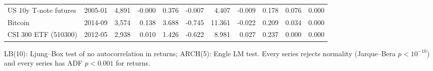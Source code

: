 \begin{table}[!htbp]
\begin{adjustbox}{max width=\textwidth}
\begin{tabular}{lrrrrrrrrrr}
US 10y T-note futures & 2005-01 & 4,891 & -0.000 & 0.376 & -0.007 & 4.407 & -0.009 & 0.178 & 0.076 & 0.000\\
Bitcoin & 2014-09 & 3,574 & 0.138 & 3.688 & -0.745 & 11.361 & -0.022 & 0.209 & 0.034 & 0.000\\
CSI 300 ETF (510300) & 2012-05 & 2,938 & 0.010 & 1.426 & -0.622 & 8.981 & 0.027 & 0.237 & 0.000 & 0.000\\
\bottomrule
\end{tabular}
\end{adjustbox}
\par\smallskip\begin{minipage}{\textwidth}\footnotesize
LB(10): Ljung--Box test of no autocorrelation in returns; ARCH(5): Engle LM test. Every series rejects normality (Jarque--Bera $p<10^{-10}$) and every series has ADF $p<0.001$ for returns.
\end{minipage}
\end{table}